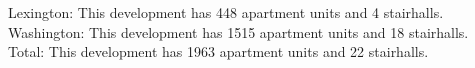 {Lexington}: This development has 448 apartment units and 4 stairhalls.\\{Washington}: This development has 1515 apartment units and 18 stairhalls.\\{Total}: This development has 1963 apartment units and 22 stairhalls.\\